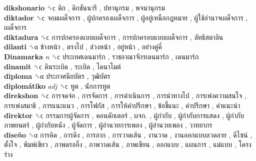 \textbf{dikshonario} ␝ϲ   ดิก ,  ดิกชันนารี ,  ปทานุกรม ,  พจนานุกรม   \\
\textbf{diktador} ␝ϲ   จอมเผด็จการ ,  ผู้ปกครองเผด็จการ ,  ผู้อยู่เหนือกฎหมาย ,  ผู้ใช้อำนาจเผด็จการ ,  เผด็จการ   \\
\textbf{diktadura} ␝ϲ   การปกครองแบบเผด็จการ ,  การปกครอบแบบเผด็จการ ,  ลัทธิสตาลิน   \\
\textbf{dilanti} ␝α   ข้างหน้า ,  ตรงไป ,  ล่วงหน้า ,  อยู่หน้า ,  อย่างคู่คี่   \\
\textbf{Dinamarka} \emph{n}  ␝ϲ   ประเทศเดนมาร์ก ,  ราชอาณาจักรเดนมาร์ก ,  เดนมาร์ก   \\
\textbf{dinamit} ␝ϲ   ดินระเบิด ,  ระเบิด ,  ไดนาไมต์   \\
\textbf{diploma} ␝α   ประกาศนียบัตร ,  วุฒิบัตร   \\
\textbf{diplomátiko} \emph{adj}  ␝ϲ   ทูต ,  นักการทูต   \\
\textbf{direkshon} ␝ϲ   การจดจ่อ ,  การจัดการ ,  การดำเนินการ ,  การนำทางไป ,  การเพ่งความสนใจ ,  การเพ่งสมาธิ ,  การแนะแนว ,  การโฟกัส ,  การให้คำปรึกษา ,  ข้อชี้แนะ ,  คำปรึกษา ,  คำแนะนำ   \\
\textbf{direktor} ␝ϲ   กรรมการผู้จัดการ ,  คอนดักเตอร์ ,  ผจก. ,  ผู้กำกับ ,  ผู้กำกับการแสดง ,  ผู้กำกับภาพยนตร์ ,  ผู้กำกับหนัง ,  ผู้จัดการ ,  ผู้อำนวยการเพลง ,  ผู้อำนวยเพลง ,  วาทยากร   \\
\textbf{diseño} ␝α   การคิด ,  การดึง ,  การลาก ,  การวาดเส้น ,  งานวาด ,  งานออกแบบลวดลาย ,  ดีไซน์ ,  ตั้งใจ ,  พิมพ์เขียว ,  ภาพดรออิ้ง ,  ภาพวาดเส้น ,  ภาพเขียน ,  ออกแบบ ,  แผนการ ,  แม่แบบ ,  โครงร่าง   \\
